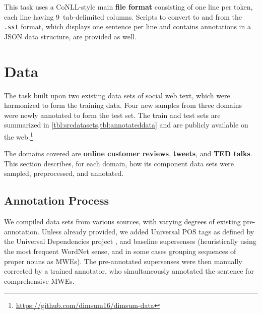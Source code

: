 \documentclass[11pt,letterpaper]{article}
\begin{document}
This task uses a CoNLL-style main \textbf{file format}
consisting of one line per token, each line having 9~tab-delimited columns.
Scripts to convert to and from the \texttt{.sst} format, which displays one sentence per line 
and contains annotations in a JSON data structure, are provided as well.

\section{Data}\label{sec:data}

The task built upon two existing data sets of social web text, which were 
harmonized to form the training data. Four new samples from three domains 
were newly annotated to form the test set.
The train and test sets are summarized in \cref{tbl:srcdatasets,tbl:annotateddata} 
and are publicly available on the web.\footnote{\url{https://github.com/dimsum16/dimsum-data}}

\begin{table}\small\centering

\label{tbl:srcdatasets}
\end{table}

\begin{table}\small\centering

\label{tbl:annotateddata}
\end{table}

The domains covered are \textbf{online customer reviews}, 
\textbf{tweets}, and \textbf{TED talks}.
This section describes, for each domain, how its component data sets were sampled, preprocessed, 
and annotated.



\subsection{Annotation Process}
We compiled data sets from various sources, with varying degrees of existing pre-annotation. 
Unless already provided, we added Universal POS tags as defined by the Universal Dependencies project \citep{nivre-15}, 
and baseline supersenses (heuristically using the most frequent WordNet sense, and
in some cases grouping sequences of proper nouns as MWEs). %
The pre-annotated supersenses were then manually corrected by a trained annotator, 
who simultaneously annotated the sentence for comprehensive MWEs. 
\end{document}
